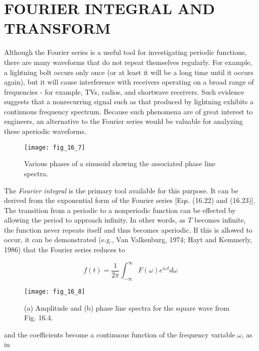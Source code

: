 \documentclass[../main.tex]{subfiles}
\begin{document}
\label{cha:cha_P_16_4} %
\section{FOURIER INTEGRAL AND TRANSFORM}

\noindent Although the Fourier series is a useful tool for investigating periodic functions, there are
many waveforms that do not repeat themselves regularly. For example, a lightning bolt
occurs only once (or at least it will be a long time until it occurs again), but it will cause interference with receivers operating on a broad range of frequencies - for example, TVs,
radios, and shortwave receivers. Such evidence suggests that a nonrecurring signal such as
that produced by lightning exhibits a continuous frequency spectrum. Because such phenomena are of great interest to engineers, an alternative to the Fourier series would be valuable for analyzing these aperiodic waveforms.

\begin{figure}[H] 
	\centering
	\texttt{[image: fig\_16\_7]}
	\caption{\textsf{Various phases of a sinusoid showing the associated phase line spectra.}}
	\label{fig:fig_16_7}
\end{figure}

The \textit{Fourier integral} is the primary tool available for this purpose. It can be derived
from the exponential form of the Fourier series [Eqs. (16.22) and (16.23)]. The transition
from a periodic to a nonperiodic function can be effected by allowing the period to approach infinity. In other words, as $T$ becomes infinite, the function never repeats itself and
thus becomes aperiodic. If this is allowed to occur, it can be demonstrated (e.g., Van
Valkenburg, 1974; Hayt and Kemmerly, 1986) that the Fourier series reduces to

\begin{equation}
	\tag{16.24}
	f(t) = \frac{1}{2 \pi} \int ^ \infty _ {-\infty} F(\omega) e ^ {i \omega t} d \omega
\end{equation}

\begin{figure}[H] 
	\centering
	\texttt{[image: fig\_16\_8]}
	\caption{\textsf{(a) Amplitude and (b) phase line spectra for the square wave from Fig. 16.4.}}
	\label{fig:fig_16_8}
\end{figure}

\noindent and the coefficients become a continuous function of the frequency variable $\omega$, as in
\end{document}
